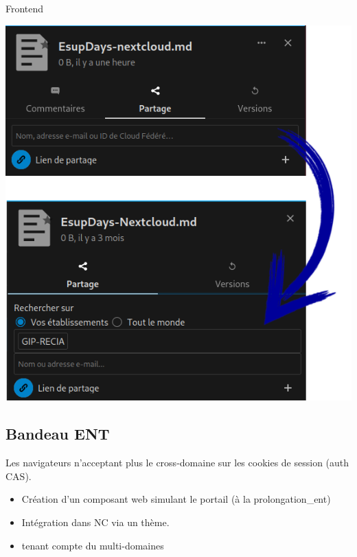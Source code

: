 \begin{frame}[fragile]{\sub}{Frontend}

\includegraphics[height=0.75\textheight]{filesharing.png}
\end{frame}

\subsection{Bandeau ENT}
\begin{frame}{\sub}
Les navigateurs n'acceptant plus le cross-domaine sur les cookies de session (auth CAS).
\begin{itemize}
	\item Création d'un composant web simulant le portail (à la prolongation\_ent)
	\item Intégration dans NC via un thème.
	\item tenant compte du multi-domaines   
\end{itemize}
\end{frame}
